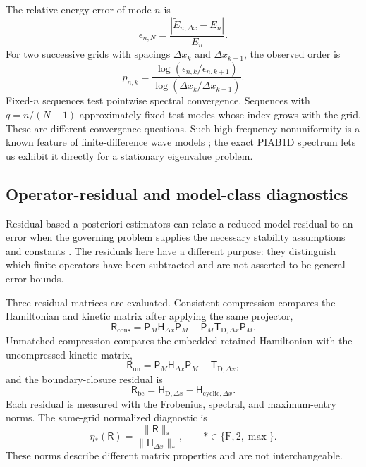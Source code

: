 \documentclass[11pt]{article}
\newcommand{\fro}{\mathrm{F}}
\newcommand{\mat}[1]{\mathsf{#1}}
\begin{document}
The relative energy error of mode $n$ is
\begin{equation}
 \epsilon_{n,N}
 =\frac{\left\lvert\widetilde E_{n,\Delta x}-E_n\right\rvert}{E_n}.
 \label{eq:relative-energy-error}
\end{equation}
For two successive grids with spacings $\Delta x_k$ and $\Delta x_{k+1}$, the
observed order is
\begin{equation}
 p_{n,k}
 =\frac{\log(\epsilon_{n,k}/\epsilon_{n,k+1})}
 {\log(\Delta x_k/\Delta x_{k+1})}.
 \label{eq:observed-order}
\end{equation}
Fixed-$n$ sequences test pointwise spectral convergence. Sequences with
$q=n/(N-1)$ approximately fixed test modes whose index grows with the grid. These are
different convergence questions. Such high-frequency nonuniformity is a known feature
of finite-difference wave models \cite{zuazua2005}; the exact PIAB1D spectrum lets us
exhibit it directly for a stationary eigenvalue problem.

\subsection{Operator-residual and model-class diagnostics}

Residual-based a posteriori estimators can relate a reduced-model residual to an error
when the governing problem supplies the necessary stability assumptions and constants
\cite{fengChellappaBenner2024}. The residuals here have a different purpose: they
distinguish which finite operators have been subtracted and are not asserted to be
general error bounds.

Three residual matrices are evaluated. Consistent compression compares the
Hamiltonian and kinetic matrix after applying the same projector,
\begin{equation}
 \mat{R}_{\mathrm{cons}}
 =\mat{P}_M\mat{H}_{\Delta x}\mat{P}_M
 -\mat{P}_M\mat{T}_{\mathrm{D},\Delta x}\mat{P}_M.
 \label{eq:method-consistent-residual}
\end{equation}
Unmatched compression compares the embedded retained Hamiltonian with the uncompressed
kinetic matrix,
\begin{equation}
 \mat{R}_{\mathrm{un}}
 =\mat{P}_M\mat{H}_{\Delta x}\mat{P}_M
 -\mat{T}_{\mathrm{D},\Delta x},
 \label{eq:method-unmatched-residual}
\end{equation}
and the boundary-closure residual is
\begin{equation}
 \mat{R}_{\mathrm{bc}}
 =\mat{H}_{\mathrm{D},\Delta x}-\mat{H}_{\mathrm{cyclic},\Delta x}.
 \label{eq:method-boundary-residual}
\end{equation}
Each residual is measured with the Frobenius, spectral, and maximum-entry norms. The
same-grid normalized diagnostic is
\begin{equation}
 \eta_{*}(\mat{R})
 =\frac{\lVert\mat{R}\rVert_*}{\lVert\mat{H}_{\Delta x}\rVert_*},
 \qquad *\in\{\fro,2,\max\}.
 \label{eq:normalized-residual}
\end{equation}
These norms describe different matrix properties and are not interchangeable.
\end{document}
